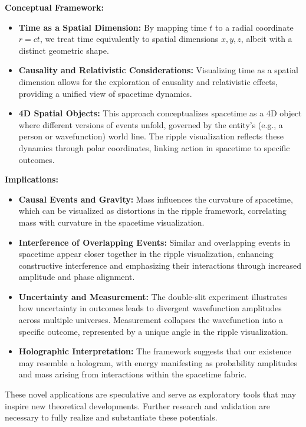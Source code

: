 \documentclass[12pt]{article}
\begin{document}
\textbf{Conceptual Framework:}
\begin{itemize}
    \item \textbf{Time as a Spatial Dimension:} By mapping time \(t\) to a radial coordinate \(r = ct\), we treat time equivalently to spatial dimensions \(x, y, z\), albeit with a distinct geometric shape.
    \item \textbf{Causality and Relativistic Considerations:} Visualizing time as a spatial dimension allows for the exploration of causality and relativistic effects, providing a unified view of spacetime dynamics.
    \item \textbf{4D Spatial Objects:} This approach conceptualizes spacetime as a 4D object where different versions of events unfold, governed by the entity's (e.g., a person or wavefunction) world line. The ripple visualization reflects these dynamics through polar coordinates, linking action in spacetime to specific outcomes.
\end{itemize}

\textbf{Implications:}
\begin{itemize}
    \item \textbf{Causal Events and Gravity:} Mass influences the curvature of spacetime, which can be visualized as distortions in the ripple framework, correlating mass with curvature in the spacetime visualization.
    \item \textbf{Interference of Overlapping Events:} Similar and overlapping events in spacetime appear closer together in the ripple visualization, enhancing constructive interference and emphasizing their interactions through increased amplitude and phase alignment.
    \item \textbf{Uncertainty and Measurement:} The double-slit experiment illustrates how uncertainty in outcomes leads to divergent wavefunction amplitudes across multiple universes. Measurement collapses the wavefunction into a specific outcome, represented by a unique angle in the ripple visualization.
    \item \textbf{Holographic Interpretation:} The framework suggests that our existence may resemble a hologram, with energy manifesting as probability amplitudes and mass arising from interactions within the spacetime fabric.
\end{itemize}

These novel applications are speculative and serve as exploratory tools that may inspire new theoretical developments. Further research and validation are necessary to fully realize and substantiate these potentials.
\end{document}

